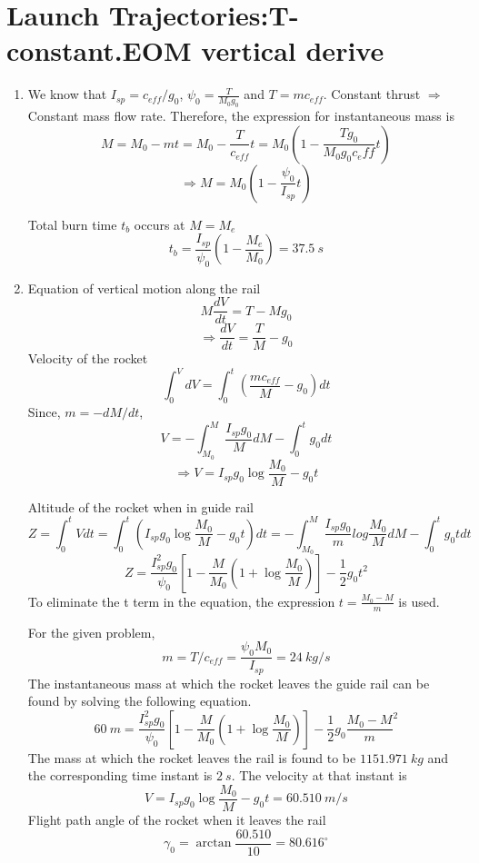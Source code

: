 \section{ Launch Trajectories:T-constant.EOM vertical derive }\label{sec:q4}    

\begin{enumerate}[label=(\alph*)]
\item
We know that $I_{sp}=c_{eff}/g_0$, $\psi_0=\frac{T}{M_0g_0}$ and $T=mc_{eff}$. Constant thrust $\Rightarrow$ Constant mass flow rate. Therefore, the expression for instantaneous mass is
$$M=M_0-mt=M_0-\frac{T}{c_{eff}}t=M_0\left(1-\frac{Tg_0}{M_0g_0c_eff}t\right)$$
$$\Rightarrow M=M_0\left(1-\frac{\psi_0}{I_{sp}}t\right)$$

Total burn time $t_b$ occurs at $M=M_e$ $$t_b=\frac{I_{sp}}{\psi_0}\left(1-\frac{M_e}{M_0}\right)=37.5\: s$$

\item
Equation of vertical motion along the rail
$$M\frac{dV}{dt}=T-Mg_0$$
$$\Rightarrow \frac{dV}{dt}=\frac{T}{M}-g_0$$
Velocity of the rocket
$$\int^V_0 dV = \int_0^t \left(\frac{mc_{eff}}{M}-g_0\right)dt$$
Since, $m=-dM/dt$,
$$V = -\int_{M_0}^M \frac{I_{sp}g_0}{M}dM-\int_0^t g_0dt$$
$$\Rightarrow V = I_{sp}g_0\log\frac{M_0}{M}-g_0t$$

Altitude of the rocket when in guide rail
$$Z=\int_0^t Vdt= \int_0^t (I_{sp}g_0\log\frac{M_0}{M}-g_0t)dt=-\int_{M_0}^M \frac{I_{sp}g_0}{m}log\frac{M_0}{M}dM - \int_0^t g_0tdt$$
$$Z=\frac{I_{sp}^2g_0}{\psi_0}\left[1-\frac{M}{M_0}\left(1+\log\frac{M_0}{M}\right)\right]-\frac{1}{2}g_0t^2$$
To eliminate the t term in the equation, the expression $t=\frac{M_0-M}{m}$ is used.

For the given problem, $$m=T/c_{eff}=\frac{\psi_0M_0}{I_{sp}}=24\: kg/s$$
The instantaneous mass at which the rocket leaves the guide rail can be found by solving the following equation.
$$60\: m=\frac{I_{sp}^2g_0}{\psi_0}\left[1-\frac{M}{M_0}\left(1+\log\frac{M_0}{M}\right)\right]-\frac{1}{2}g_0\frac{M_0-M}{m}^2$$
The mass at which the rocket leaves the rail is found to be $1151.971\: kg$ and the corresponding time instant is $2\: s$. The velocity at that instant is $$V= I_{sp}g_0\log\frac{M_0}{M}-g_0t=60.510\: m/s$$
Flight path angle of the rocket when it leaves the rail
$$\gamma_0=\arctan\frac{60.510}{10}=80.616^\circ$$


\end{enumerate}
